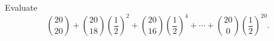 Evaluate
\[\binom{20}{20}+\binom{20}{18}\left(\dfrac12\right)^2+\binom{20}{16}\left(\dfrac12\right)^4+\cdots+\binom{20}{0}\left(\dfrac12\right)^{20}.\]
